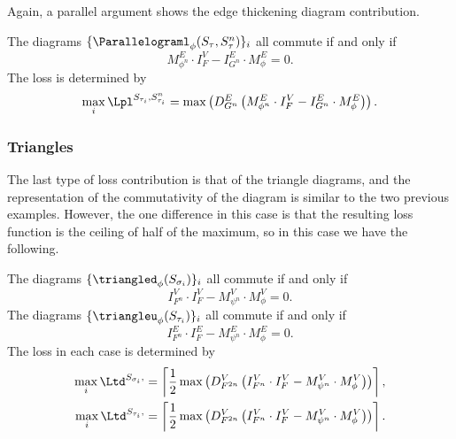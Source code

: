 Again, a parallel argument shows the edge thickening diagram contribution. 

\begin{lemma}
\label{lem:parallelogramcommute}
The diagrams $\{\Parallelograml_\phi(S_{\tau},S_{\tau}^n)\}_i$ all commute if and only if 
\begin{equation*}
M_{\phi^n}^E \cdot I_F^V - I_{G^n}^E \cdot M_{\phi}^E= 0.
\end{equation*}
The loss is determined by
\begin{equation*}
\max_{i} \Lpl^{S_{\tau_{i}},S_{\tau_{i}}^n} = \max \left(D_{G^n}^E \left(M_{\phi^n}^E \cdot I_F^V - I_{G^n}^E \cdot M_{\phi}^E\right) \right).
\end{equation*}
\end{lemma}

%
\subsubsection{Triangles}
The last type of loss contribution is that of the triangle diagrams, and the representation of the commutativity of the diagram is similar to the two previous examples. 
However, the one difference in this case is that the resulting loss function is the ceiling of half of the maximum, so in this case we have the following. 

\begin{lemma}
\label{lem:trianglecommute}    
The diagrams $\{\triangled_\phi(S_{\sigma_i})\}_i$ all commute if and only if 
\begin{equation*}
I_{F^n}^V \cdot I_F^V - M_{\psi^n}^V\cdot M_{\phi}^V= 0.
\end{equation*}
The diagrams  $\{\triangleu_\phi(S_{\tau_i})\}_i$ all commute if and only if 
\begin{equation*}
I_{F^n}^E \cdot I_F^E - M_{\psi^n}^E\cdot M_{\phi}^E = 0.
\end{equation*}
The loss in each case is determined by
\begin{align*}
%
%
\max_{i} \Ltd^{S_{\sigma_{i}},} &= \left\lceil\frac{1}{2}\max\left(D_{F^{2n}}^V \left(I_{F^n}^V \cdot I_F^V - M_{\psi^n}^V\cdot M_{\phi}^V \right) \right) \right\rceil,\\
\max_{i} \Ltd^{S_{\tau_{i}},} &= \left\lceil\frac{1}{2}\max\left(D_{F^{2n}}^V \left(I_{F^n}^V \cdot I_F^V - M_{\psi^n}^V\cdot M_{\phi}^V \right) \right)\right\rceil.
\end{align*}
\end{lemma}

